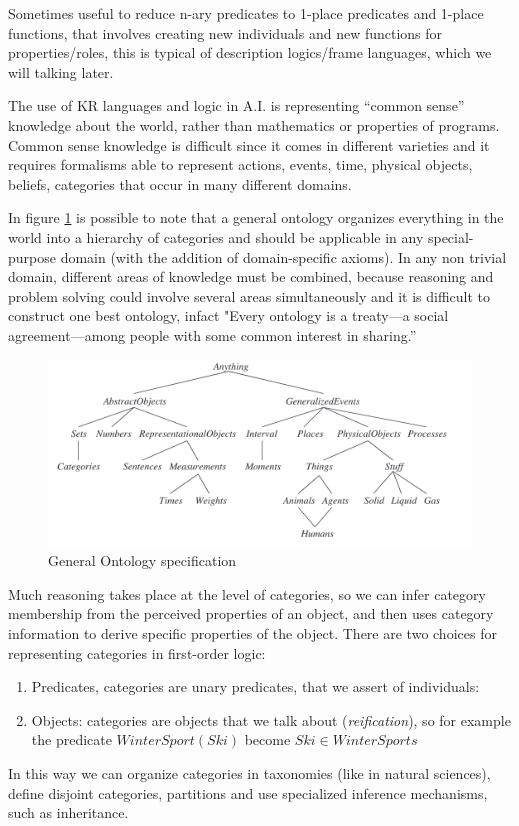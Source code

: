 Sometimes useful to reduce n-ary predicates to 1-place predicates and 1-place functions,
that involves creating new individuals and new functions for properties/roles,
this is typical of description logics/frame languages, which we will talking later.

The use of KR languages and logic in A.I. is representing “common sense”
knowledge about the world, rather than mathematics or properties of programs.\newline
Common sense knowledge is difficult since it comes in different varieties and it
requires formalisms able to represent actions, events, time, physical objects, beliefs,
categories that occur in many different domains.

In figure \ref{img:general} is possible to note that a general ontology organizes 
everything in the world into a hierarchy of categories and should be applicable
in any special-purpose domain (with the addition of domain-specific axioms).\newline
In any non trivial domain, different areas of knowledge must be combined,
because reasoning and problem solving could involve several areas simultaneously and 
it is difficult to construct one best ontology, infact "Every ontology is a treaty—a
social agreement—among people with some common interest in sharing.”

\begin{figure}
	\includegraphics[width=\textwidth]{Images/generalOntology}
	\caption{General Ontology specification}
	\label{img:general}
\end{figure}
Much reasoning takes place at the level of categories, so we can infer category
membership from the perceived properties of an object, and then uses category
information to derive specific properties of the object.\newline
There are two choices for representing categories in first-order logic:
\begin{enumerate}
    \item Predicates, categories are unary predicates, that we assert of individuals:
    \item Objects: categories are objects that we talk about (\emph{reification}),
	  so for example the predicate $WinterSport(Ski)$ become $Ski \in WinterSports$
\end{enumerate}
In this way we can organize categories in taxonomies (like in natural sciences),
define disjoint categories, partitions and use specialized inference mechanisms,
such as inheritance. 


